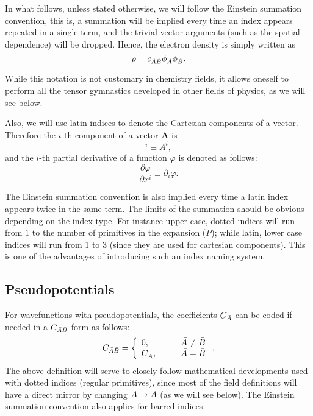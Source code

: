 In what follows, unless stated otherwise, we will follow the Einstein summation convention, this is, a summation will be implied every time an index appears repeated in a single term, and the trivial vector arguments (such as the spatial dependence) will be dropped. Hence, the electron density is simply written as
%
\begin{equation}
   \rho=c_{\dot{A}\dot{B}}\phi_{\dot{A}}\phi_{\dot{B}}.
\end{equation}
%

While this notation is not customary in chemistry fields, it allows oneself to perform all the tensor gymnastics developed in other fields of physics, as we will see below.

Also, we will use latin indices to denote the Cartesian components of a vector. Therefore the $i$-th component of a vector $\boldsymbol{A}$ is
%
\begin{equation}
   [\boldsymbol{A}]^{i}\equiv A^i,
\end{equation}
%
and the $i$-th partial derivative of a function $\varphi$ is denoted as follows:
%
\begin{equation}
   \frac{\partial\varphi}{\partial x^i}\equiv\partial_i\varphi.
\end{equation}
%

The Einstein summation convention is also implied every time a latin index appears twice in the
same term. The limits of the summation should be obvious depending on the index type. For
instance upper case, dotted indices will run from $\dot{1}$ to the number of primitives in
the expansion ($\dot{P}$); while latin, lower case indices will run from 1 to 3 (since they
are used for cartesian components). This is one of the advantages of introducing such an
index naming system.

\subsection{Pseudopotentials}

For wavefunctions with pseudopotentials, the coefficients $C_{\bar{A}}$ can be coded if needed
in a $C_{\bar{A}\bar{B}}$ form as follows:
%
\begin{equation}%
  C_{\bA\bB}=\left\{
  \begin{array}{ll}
    0,&\qquad \bA\neq\bB\\
    C_{\bA},&\qquad\bA=\bB
  \end{array}
  \right..
\end{equation}
%
The above definition will serve to closely follow mathematical developments used with
dotted indices (regular primitives), since most of the field definitions will have
a direct mirror by changing $\dot{A}\to\bar{A}$ (as we will see below). The Einstein
summation convention also applies for barred indices.

